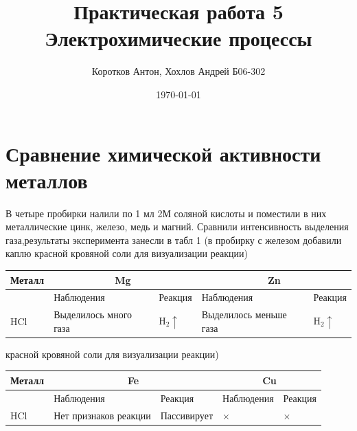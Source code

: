 \documentclass[a4paper,12pt]{article}
\author{Коротков Антон, Хохлов Андрей Б06-302}
\title{Практическая работа 5 \\ 
 \textbf{Электрохимические процессы}}
\date{\today}
\begin{document}
 
{\large\maketitle} 
\section{Сравнение химической активности металлов} 
В четыре пробирки налили по 1 мл 2М соляной кислоты и поместили в них 
металлические цинк, железо, медь и магний. Сравнили интенсивность выделения газа,результаты эксперимента занесли в табл 1 (в пробирку с железом добавили каплю 
красной кровяной соли для визуализации реакции) 
\begin{table}[h] 
\centering 
       \begin{tabular}{|l|l|l|l|l|} 
           \hline 
       Металл & \multicolumn{2}{|c|}{Mg} & \multicolumn{2}{|c|}{Zn}  \\ \hline 
        ~ & Наблюдения  & Реакция & Наблюдения  & Реакция  \\ \hline 
        HCl & Выделилось много газа & $\mathrm{H_2\uparrow}$ & Выделилось меньше газа &  $\mathrm{H_2\uparrow}$  \\ \hline 
    \end{tabular} 
\end{table} 
красной кровяной соли для визуализации реакции) 
\begin{table}[h] 
\centering 
       \begin{tabular}{|l|l|l|l|l|} 
    \hline 
       Металл & \multicolumn{2}{|c|}{Fe}& \multicolumn{2}{|c|}{Cu}   \\ \hline 
        ~ &Наблюдения  & Реакция & Наблюдения  & Реакция \\ \hline 
        HCl & Нет признаков реакции & Пассивирует & $\times$  & $\times$ \\ \hline 
    \end{tabular} 
\end{table} 
 
\end{document}
